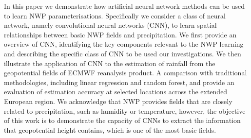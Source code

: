 \documentclass[twocol]{ametsoc}
\begin{document}
In this paper we demonstrate how artificial neural network methods can be used to learn NWP parameterisations. Specifically we consider a class of neural network, namely convolutional neural networks (CNN), to learn spatial relationships between basic NWP fields and precipitation. We first provide an overview of CNN, identifying the key components relevant to the NWP learning and describing the specific class of CNN to be used our investigations. We then illustrate the application of CNN to the estimation of rainfall from the geopotential fields of ECMWF reanalysis product.  A comparison with traditional methodologies, including linear regression and random forest, and provide an evaluation of estimation accuracy at selected locations across the extended European region. We acknowledge that NWP provides fields that are closely related to precipitation, such as humidity or temperature, however, the objective of this work is to demonstrate the capacity of CNNs to extract the information that geopotential height contains, which is one of the most basic fields.





\end{document}
